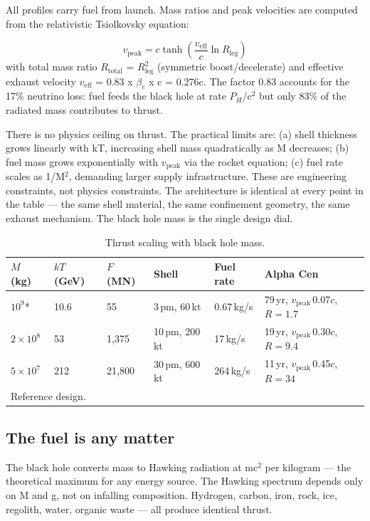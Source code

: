 \documentclass[12pt,a4paper]{article}
\begin{document}
All profiles carry fuel from launch. Mass ratios and peak velocities are computed from the relativistic Tsiolkovsky equation:

\begin{equation}
v_\text{peak} = c \tanh\!\left(\frac{v_\text{eff}}{c} \ln R_\text{leg}\right)
\end{equation}
with total mass ratio $R_{\text{total}}$ = $R_{\text{leg}} ^{2}$ (symmetric boost/decelerate) and effective exhaust velocity $v_{\text{eff}}$ = 0.83 x $\beta_e$ x c = 0.276c. The factor 0.83 accounts for the 17\% neutrino loss: fuel feeds the black hole at rate $P_H$/c$^{2}$ but only 83\% of the radiated mass contributes to thrust.

There is no physics ceiling on thrust. The practical limits are: (a) shell thickness grows linearly with kT, increasing shell mass quadratically as M decreases; (b) fuel mass grows exponentially with $v_{\text{peak}}$ via the rocket equation; (c) fuel rate scales as 1/M$^{2}$, demanding larger supply infrastructure. These are engineering constraints, not physics constraints. The architecture is identical at every point in the table --- the same shell material, the same confinement geometry, the same exhaust mechanism. The black hole mass is the single design dial.


\begin{table}[h]
\centering
\caption{Thrust scaling with black hole mass.}
\label{tab:thrust}
\small
\begin{tabular}{llllll}
\hline
\textbf{$M$ (kg)} & \textbf{$kT$ (GeV)} & \textbf{$F$ (MN)} & \textbf{Shell} & \textbf{Fuel rate} & \textbf{Alpha Cen} \\
\hline
$10^9$* & 10.6 & 55 & 3\,pm, 60\,kt & 0.67\,kg/s & 79\,yr, $v_\text{peak}$\,0.07$c$, $R{=}1.7$ \\
$2 \times 10^8$ & 53 & 1,375 & 10\,pm, 200\,kt & 17\,kg/s & 19\,yr, $v_\text{peak}$\,0.30$c$, $R{=}9.4$ \\
$5 \times 10^7$ & 212 & 21,800 & 30\,pm, 600\,kt & 264\,kg/s & 11\,yr, $v_\text{peak}$\,0.45$c$, $R{=}34$ \\
\hline
\multicolumn{6}{l}{\footnotesize * Reference design.} \\
\end{tabular}
\end{table}

\subsection{The fuel is any matter}
The black hole converts mass to Hawking radiation at mc$^{2}$ per kilogram --- the theoretical maximum for any energy source. The Hawking spectrum depends only on M and g, not on infalling composition. Hydrogen, carbon, iron, rock, ice, regolith, water, organic waste --- all produce identical thrust.
\end{document}
